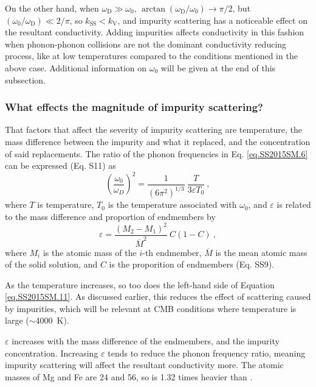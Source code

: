 On the other hand, when $\omega_{\mathrm{D}}\gg\omega_{\mathrm{0}}$, $\arctan(\omega_{\mathrm{D}}/\omega_{\mathrm{0}})\rightarrow\pi/2$, but $(\omega_{\mathrm{0}}/\omega_{\mathrm{D}})\ll 2/\pi$, so $k_{\mathrm{SS}} < k_{\mathrm{V}}$, and impurity scattering has a noticeable effect on the resultant conductivity. Adding impurities affects conductivity in this fashion when phonon-phonon collisions are not the dominant conductivity reducing process, like at low temperatures compared to the conditions mentioned in the above case. Additional information on $\omega_{\mathrm{0}}$ will be given at the end of this subsection.

\subsubsection{What effects the magnitude of impurity scattering?} 

That factors that affect the severity of impurity scattering are temperature, the mass difference between the impurity and what it replaced, and the concentration of said replacements. The ratio of the phonon frequencies in Eq. \ref{eq.SS2015SM.6} can be expressed (Eq. S11) as
%
\begin{equation}
\left ( \frac{\omega_{0}}{\omega_{D}} \right )^{2} = \frac{1}{\left ( 6\pi^{2} \right )^{1/3}} \ \frac{T}{3 \varepsilon T_{0}} \ ,
\label{eq.SS2015SM.11}
\end{equation}
%
where $T$ is temperature, $T_{\mathrm{0}}$ is the temperature associated with $\omega_{0}$, and $\varepsilon$ is related to the mass difference and proportion of endmembers by
%
\begin{equation}
\varepsilon = \frac{\left (M_{2}-M_{1}  \right )^{2}}{\overline{M}^{2}} \ C\left ( 1-C \right ) \ ,
\label{eq.SS2015SM.9}
\end{equation}
%
where $M_{i}$ is the atomic mass of the $i$-th endmember, $\overline{M}$ is the mean atomic mass of the solid solution, and $C$ is the proporition of endmembers (Eq. SS9).

As the temperature increases, so too does the left-hand side of Equation \ref{eq.SS2015SM.11}. As discussed earlier, this reduces the effect of scattering caused by impurities, which will be relevant at CMB conditions where temperature is large ($\sim$4000~K). 

$\varepsilon$ increases with the mass difference of the endmembers, and the impurity concentration. Increasing $\varepsilon$ tends to reduce the phonon frequency ratio, meaning impurity scattering will affect the resultant conductivity more. The atomic masses of Mg and Fe are 24 and 56, so \fesios is 1.32 times heavier than \mgsio. 

